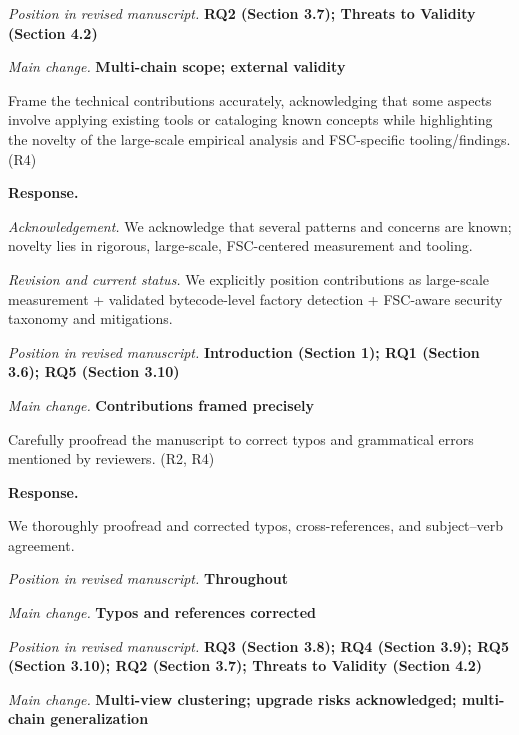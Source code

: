 \documentclass[acmsmall]{acmart}
\begin{document}
	\textit{Position in revised manuscript.}
	{\color{red}\textbf{RQ2 (Section 3.7); Threats to Validity (Section 4.2)}}

	\textit{Main change.} {\color{blue}\textbf{Multi-chain scope; external validity}}

	\begin{tcolorbox}
		[commentbox,title=Editor/AE -- Comment 7.4] Frame the technical contributions accurately, acknowledging
		that some aspects involve applying existing tools or cataloging known concepts while highlighting
		the novelty of the large-scale empirical analysis and FSC-specific tooling/findings. (R4)
	\end{tcolorbox}

	\noindent
	\textbf{Response.}

	\textit{Acknowledgement.} We acknowledge that several patterns and concerns are known; novelty
	lies in rigorous, large-scale, FSC-centered measurement and tooling.

	\textit{Revision and current status.} We explicitly position contributions as large-scale measurement
	+ validated bytecode-level factory detection + FSC-aware security taxonomy and mitigations.

	\textit{Position in revised manuscript.}
	{\color{red}\textbf{Introduction (Section 1); RQ1 (Section 3.6); RQ5 (Section 3.10)}}

	\textit{Main change.} {\color{blue}\textbf{Contributions framed precisely}}

	\begin{tcolorbox}
		[commentbox,title=Editor/AE -- Comment 7.5] Carefully proofread the manuscript to correct
		typos and grammatical errors mentioned by reviewers. (R2, R4)
	\end{tcolorbox}

	\noindent
	\textbf{Response.}

	We thoroughly proofread and corrected typos, cross-references, and subject–verb agreement.

	\textit{Position in revised manuscript.} {\color{red}\textbf{Throughout}}

	\textit{Main change.} {\color{blue}\textbf{Typos and references corrected}}

	\vspace{0.25em}
	\textit{Position in revised manuscript.} {\color{red}\textbf{RQ3 (Section 3.8); RQ4 (Section 3.9); RQ5 (Section 3.10); RQ2 (Section 3.7); Threats to Validity (Section 4.2)}}

	\textit{Main change.} {\color{blue}\textbf{Multi-view clustering; upgrade risks acknowledged; multi-chain generalization}}
\end{document}
